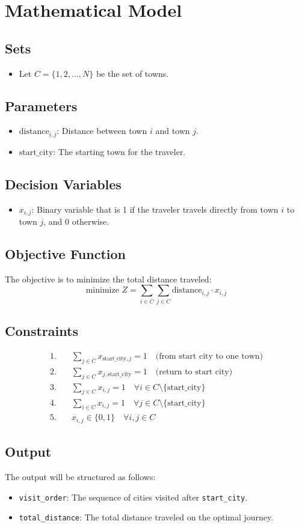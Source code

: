 \documentclass{article}
\begin{document}
\section*{Mathematical Model}

\subsection*{Sets}
\begin{itemize}
    \item Let \( C = \{ 1, 2, \ldots, N \} \) be the set of towns.
\end{itemize}

\subsection*{Parameters}
\begin{itemize}
    \item \( \text{distance}_{i,j} \): Distance between town \( i \) and town \( j \).
    \item \( \text{start\_city} \): The starting town for the traveler.
\end{itemize}

\subsection*{Decision Variables}
\begin{itemize}
    \item \( x_{i,j} \): Binary variable that is 1 if the traveler travels directly from town \( i \) to town \( j \), and 0 otherwise.
\end{itemize}

\subsection*{Objective Function}
The objective is to minimize the total distance traveled:
\[
\text{minimize } Z = \sum_{i \in C} \sum_{j \in C} \text{distance}_{i,j} \cdot x_{i,j}
\]

\subsection*{Constraints}
\begin{align*}
1. & \quad \sum_{j \in C} x_{\text{start\_city},j} = 1 \quad \text{(from start city to one town)} \\
2. & \quad \sum_{j \in C} x_{j,\text{start\_city}} = 1 \quad \text{(return to start city)} \\
3. & \quad \sum_{j \in C} x_{i,j} = 1 \quad \forall i \in C \setminus \{\text{start\_city}\} \\
4. & \quad \sum_{i \in C} x_{i,j} = 1 \quad \forall j \in C \setminus \{\text{start\_city}\} \\
5. & \quad x_{i,j} \in \{0, 1\} \quad \forall i,j \in C
\end{align*}

\subsection*{Output}
The output will be structured as follows:
\begin{itemize}
    \item \texttt{visit\_order}: The sequence of cities visited after \texttt{start\_city}.
    \item \texttt{total\_distance}: The total distance traveled on the optimal journey.
\end{itemize}
\end{document}

